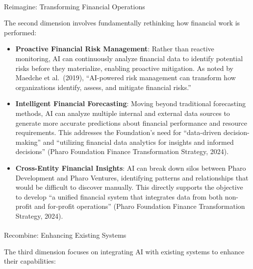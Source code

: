 \documentclass[
]{article}
\makeatletter
\let\oldparagraph\paragraph
\renewcommand{\paragraph}{
    \@ifstar
      \xxxParagraphStar
      \xxxParagraphNoStar
  }
\newcommand{\xxxParagraphStar}[1]{\oldparagraph*{#1}\mbox{}}
\newcommand{\xxxParagraphNoStar}[1]{\oldparagraph{#1}\mbox{}}
\makeatother
\begin{document}
\paragraph{Reimagine: Transforming Financial
Operations}\label{reimagine-transforming-financial-operations}

The second dimension involves fundamentally rethinking how financial
work is performed:

\begin{itemize}
\item
  \textbf{Proactive Financial Risk Management}: Rather than reactive
  monitoring, AI can continuously analyze financial data to identify
  potential risks before they materialize, enabling proactive
  mitigation. As noted by Maedche et al.~(2019), ``AI-powered risk
  management can transform how organizations identify, assess, and
  mitigate financial risks.''
\item
  \textbf{Intelligent Financial Forecasting}: Moving beyond traditional
  forecasting methods, AI can analyze multiple internal and external
  data sources to generate more accurate predictions about financial
  performance and resource requirements. This addresses the Foundation's
  need for ``data-driven decision-making'' and ``utilizing financial
  data analytics for insights and informed decisions'' (Pharo Foundation
  Finance Transformation Strategy, 2024).
\item
  \textbf{Cross-Entity Financial Insights}: AI can break down silos
  between Pharo Development and Pharo Ventures, identifying patterns and
  relationships that would be difficult to discover manually. This
  directly supports the objective to develop ``a unified financial
  system that integrates data from both non-profit and for-profit
  operations'' (Pharo Foundation Finance Transformation Strategy, 2024).
\end{itemize}

\paragraph{Recombine: Enhancing Existing
Systems}\label{recombine-enhancing-existing-systems}

The third dimension focuses on integrating AI with existing systems to
enhance their capabilities:
\end{document}
